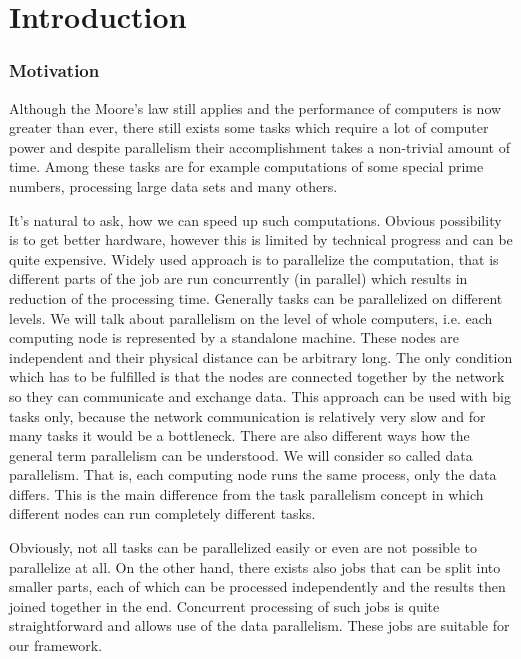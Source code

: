 \chapter*{Introduction}
\subsection*{Motivation}

Although the Moore's law still applies and the performance of computers is now greater than ever, there still exists some tasks which require a lot of computer power and despite parallelism their accomplishment takes a non-trivial amount of time. Among these tasks are for example computations of some special prime numbers, processing large data sets and many others.

It's natural to ask, how we can speed up such computations. Obvious possibility is to get better hardware, however this is limited by technical progress and can be quite expensive. Widely used approach is to parallelize the computation, that is different parts of the job are run concurrently (in parallel) which results in reduction of the processing time. Generally tasks can be parallelized on different levels. We will talk about parallelism on the level of whole computers, i.e. each computing node is represented by a standalone machine. These nodes are independent and their physical distance can be arbitrary long. The only condition which has to be fulfilled is that the nodes are connected together by the network so they can communicate and exchange data. This approach can be used with big tasks only, because the network communication is relatively very slow and for many tasks it would be a bottleneck. There are also different ways how the general term parallelism can be understood. We will consider so called data parallelism. That is, each computing node runs the same process, only the data differs. This is the main difference from the task parallelism concept in which different nodes can run completely different tasks.

Obviously, not all tasks can be parallelized easily or even are not possible to parallelize at all. On the other hand, there exists also jobs that can be split into smaller parts, each of which can be processed independently and the results then joined together in the end. Concurrent processing of such jobs is quite straightforward and allows use of the data parallelism. These jobs are suitable for our framework.

